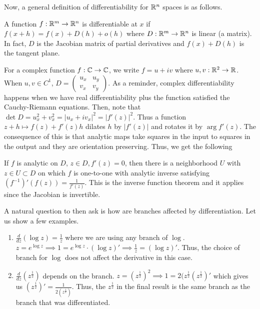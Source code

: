 \documentclass[11pt,leqno,oneside]{amsart}
\numberwithin{thm}{section}
\begin{document}
    Now, a general definition of differentiability for ${\mathbb R}^n$ spaces is as
    follows.
    \begin{defn}
        A function $f: {\mathbb R}^m \to {\mathbb R}^n$ is differentiable at $x$ if $f(x+h) =
        f(x)+D(h)+o(h)$ where $D: {\mathbb R}^m \to {\mathbb R}^n$ is linear (a matrix). In fact,
        $D$ is the Jacobian matrix of partial derivatives and $f(x)+D(h)$ is
        the tangent plane.
    \end{defn}
    For a complex function $f: {\mathbb C} \to {\mathbb C}$, we write $f = u+iv$ where $u,v: {\mathbb R}^2
    \to {\mathbb R}$. When $u,v \in C^1$, $D = \left( \begin{array}{cc}
        u_x & u_y \\
        v_x & v_y
    \end{array}\right)$. As a reminder, complex differentiability happens when
    we have real differentiability plus the function satisfied the
    Cauchy-Riemann equations. Then, note that $\det D = u_x^2 + v_x^2 =
    |u_x+iv_x|^2 = |f'(z)|^2$. Thus a function $z+h \mapsto f(z) + f'(z)h$
    dilates $h$ by $|f'(z)|$ and rotates it by $\arg f'(z)$. The consequence of
    this is that analytic maps take squares in the input to squares in the
    output and they are orientation preserving. Thus, we get the following
    \begin{rmk}
        If $f$ is analytic on $D$, $z \in D, f'(z) = 0$, then there is a
        neighborhood $U$ with $z \in U \subset D$ on which $f$ is one-to-one
        with analytic inverse satisfying $(f^{-1})'(f(z)) = \frac{1}{f'(z)}$.
        This is the inverse function theorem and it applies since the Jacobian
        is invertible.
    \end{rmk}
    A natural question to then ask is how are branches affected by
    differentiation. Let us show a few examples.
    \begin{example}
        \begin{enumerate}
            \item $\frac{d}{dz}(\log z) = \frac{1}{z}$ where we are using any
                branch of $\log$. $z = e^{\log z} \implies 1 = e^{\log z} \cdot
                (\log z)' \implies \frac{1}{z} = (\log z)'$. Thus, the choice
                of branch for $\log$ does not affect the derivative in this
                case.
            \item $\frac{d}{dz}(z^{\frac{1}{2}})$ depends on the branch. $z =
                (z^{\frac{1}{2}})^2 \implies 1 =
                2(z^{\frac{1}{2}}(z^{\frac{1}{2}})'$ which gives us
                $(z^{\frac{1}{2}})' = \frac{1}{2(z^\frac{1}{2})}$. Thus, the
                $z^\frac{1}{2}$ in the final result is the same branch as the
                branch that was differentiated.
        \end{enumerate}
    \end{example}
\end{document}
